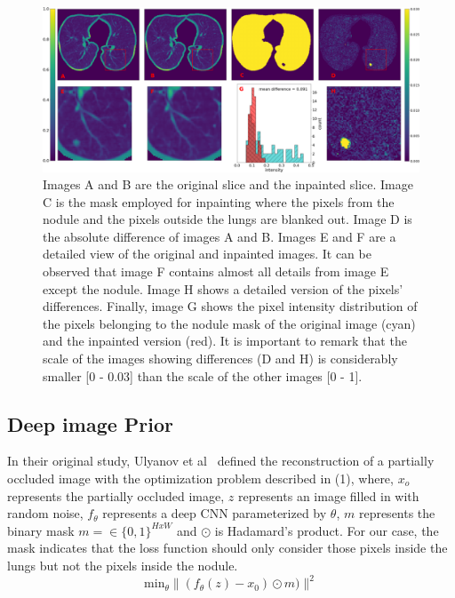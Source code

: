 \documentclass[runningheads]{llncs}
\begin{document}
\begin{figure}
\includegraphics[width=\textwidth]{inpainting-difference-caption.png}
\caption{Images A and B are the original slice and the inpainted slice. Image C is the mask employed for inpainting where the pixels from the nodule and the pixels outside the lungs are blanked out. Image D is the absolute difference of images A and B. Images E and F are a detailed view of the original and inpainted images. It can be observed that image F contains almost all details from image E except the nodule. Image H shows a detailed version of the pixels' differences. Finally, image G shows the pixel intensity distribution of the pixels belonging to the nodule mask of the original image (cyan) and the inpainted version (red). It is important to remark that the scale of the images showing differences (D and H) is considerably smaller [0 - 0.03] than the scale of the other images [0 - 1].} \label{fig1}
\end{figure}

\subsection{Deep image Prior}
In their original study, Ulyanov et al~\cite{DBLP:journals/corr/abs-1711-10925} defined the reconstruction of a partially occluded image with the optimization problem described in (1), where, \(x_o\) represents the partially occluded image, \(z\) represents an image filled in with random noise, \(f_\theta\) represents a deep CNN parameterized by \(\theta\), \(m\) represents the binary mask \(m = \in \{0, 1\}^{HxW} \) and \(\odot\) is Hadamard's product. For our case, the mask indicates that the loss function should only consider those pixels inside the lungs but not the pixels inside the nodule. 
\begin{equation}
\textrm{min}_\theta  \|(f_\theta(z) - x_0) \odot m) \|^2
\end{equation}
\end{document}
